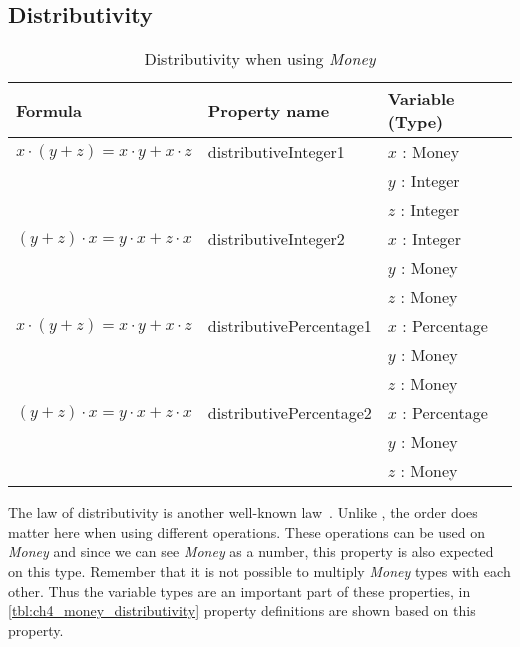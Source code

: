 \subsection*{Distributivity}
\label{ssct:properties_distributivity}
\begin{table}[!ht]
\centering
\begin{tabular}{lll}
\hline
                        \textbf{Formula}                               & \textbf{Property name}  & \textbf{Variable (Type)} \\ \hline
\rowcolor[HTML]{EFEFEF} $x \cdot (y + z) = x \cdot y + x \cdot z$ & distributiveInteger1    & $x$ : Money              \\
\rowcolor[HTML]{EFEFEF}                                                &                         & $y$ : Integer            \\
\rowcolor[HTML]{EFEFEF}                                                &                         & $z$ : Integer            \\
                        $(y + z) \cdot x = y \cdot x + z \cdot x$ & distributiveInteger2    & $x$ : Integer            \\
                                                                       &                         & $y$ : Money              \\
                                                                       &                         & $z$ : Money              \\
\rowcolor[HTML]{EFEFEF} $x \cdot (y + z) = x \cdot y + x \cdot z$ & distributivePercentage1 & $x$ : Percentage         \\
\rowcolor[HTML]{EFEFEF}                                                &                         & $y$ : Money              \\
\rowcolor[HTML]{EFEFEF}                                                &                         & $z$ : Money              \\
                        $(y + z) \cdot x = y \cdot x + z \cdot x$ & distributivePercentage2 & $x$ : Percentage         \\
                                                                       &                         & $y$ : Money              \\
                                                                       &                         & $z$ : Money              \\ \hline
\end{tabular}
\caption{Distributivity when using \textit{Money}}
\label{tbl:ch4_money_distributivity}
\end{table}
\FloatBarrier\noindent
The law of distributivity is another well-known law~\cite{baumgart1961axioms}.
Unlike , the order does matter here when
using different operations. These operations can be used on \textit{Money} and
since we can see \textit{Money} as a number, this property is also expected on
this type. Remember that it is not possible to multiply \textit{Money} types
with each other.
Thus the variable types are an important part of these properties, in
\autoref{tbl:ch4_money_distributivity} property definitions are shown based on
this property.

